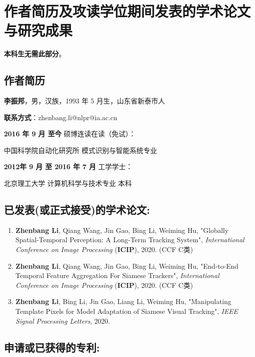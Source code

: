 \chapter{作者简历及攻读学位期间发表的学术论文与研究成果}

\textbf{本科生无需此部分}。

\section*{作者简历}

\textbf{李振邦}，男，汉族，1993 年 5 月生，山东省新泰市人

\textbf{联系方式}：zhenbang.li@nlpr@ia.ac.cn

\textbf{2016 年 9 月 至今} 硕博连读在读（免试）：

	中国科学院自动化研究所 模式识别与智能系统专业

\textbf{2012年 9 月 至 2016 年 7 月} 工学学士：

	北京理工大学 计算机科学与技术专业 本科


\section*{已发表(或正式接受)的学术论文:}

{
\setlist[enumerate]{}%
\begin{enumerate}[nosep]
    \item \textbf{Zhenbang Li}, Qiang Wang, Jin Gao,  Bing Li, Weiming Hu, "Globally Spatial-Temporal Perception: A Long-Term Tracking System", \textit{International Conference on Image Processing} (\textbf{ICIP}), 2020. (CCF C类)
    \item \textbf{Zhenbang Li}, Qiang Wang, Jin Gao,  Bing Li, Weiming Hu, "End-to-End Temporal Feature Aggregation For Siamese Trackers", \textit{International Conference on Image Processing} (\textbf{ICIP}), 2020. (CCF C类)
    \item \textbf{Zhenbang Li}, Bing Li, Jin Gao, Liang Li, Weiming Hu, "Manipulating Template Pixels for Model Adaptation of Siamese Visual Tracking", \textit{IEEE Signal Processing Letters}, 2020.
\end{enumerate}
}

\section*{申请或已获得的专利:}

